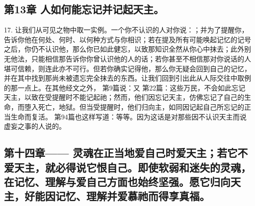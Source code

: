 \subsection{第13章 人如何能忘记并记起天主。}

17. 让我们从可见之物中取一实例。一个你不认识的人对你说：；并为了提醒你，告诉你他在何处、何时、以何种方式与你相识；若在提及所有可能唤起记忆的记号之后，你仍不认识他，那么你已如此健忘，以致那知识全然从你心中抹去；此外别无他法，只能相信那告诉你你曾认识他的人的话；若你甚至不相信那对你说话的人堪可信赖，则连此亦不可行。但若你确实记得他，那么你无疑会回到自己的记忆，并在其中找到那尚未被遗忘完全抹去的东西。让我们回到引出此从人际交往中取例的那一点上。在其他经文之外， 第9篇说：又 第22篇：这些万民，不会如此忘记天主，以致在受提醒时不能记起祂；然而，他们因忘记天主，仿佛忘记了自己的生命，而堕入死亡，地狱。但当受提醒时，他们归向主，如同因记起自己所忘记的正当生命而复活。 第94篇也这样写道：等等。因为这话是对那些因不认识天主而说虚妄之事的人说的。\par


\subsection{第十四章—— 灵魂在正当地爱自己时爱天主；若它不爱天主，就必得说它恨自己。即使软弱和迷失的灵魂，在记忆、理解与爱自己方面也始终坚强。愿它归向天主，好能因记忆、理解并爱慕祂而得享真福。}

